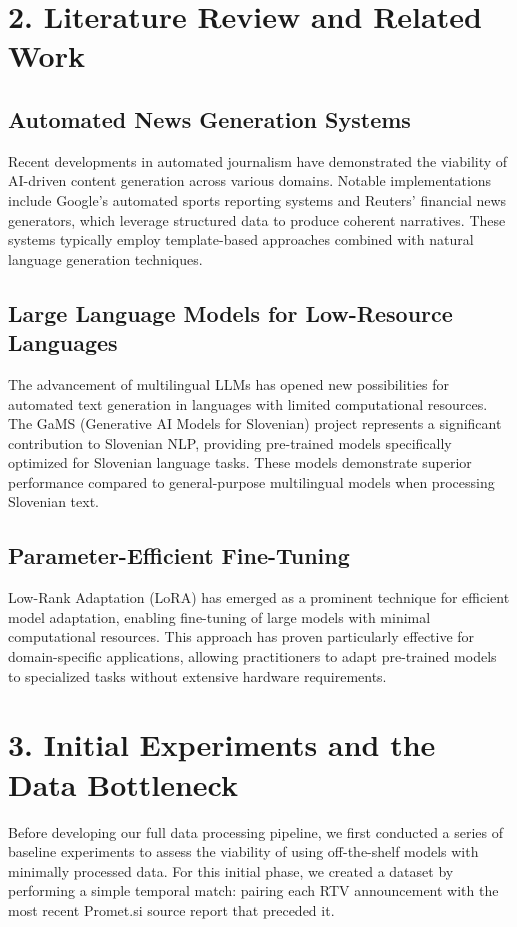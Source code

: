 \documentclass[fleqn,moreauthors,10pt]{ds_report}
\begin{document}
\section*{2. Literature Review and Related Work}

\subsection*{Automated News Generation Systems}
Recent developments in automated journalism have demonstrated the viability of AI-driven content generation across various domains. Notable implementations include Google's automated sports reporting systems and Reuters' financial news generators, which leverage structured data to produce coherent narratives. These systems typically employ template-based approaches combined with natural language generation techniques.

\subsection*{Large Language Models for Low-Resource Languages}
The advancement of multilingual LLMs has opened new possibilities for automated text generation in languages with limited computational resources. The GaMS (Generative AI Models for Slovenian) project represents a significant contribution to Slovenian NLP, providing pre-trained models specifically optimized for Slovenian language tasks. These models demonstrate superior performance compared to general-purpose multilingual models when processing Slovenian text.

\subsection*{Parameter-Efficient Fine-Tuning}
Low-Rank Adaptation (LoRA) has emerged as a prominent technique for efficient model adaptation, enabling fine-tuning of large models with minimal computational resources. This approach has proven particularly effective for domain-specific applications, allowing practitioners to adapt pre-trained models to specialized tasks without extensive hardware requirements.

\section*{3. Initial Experiments and the Data Bottleneck}
Before developing our full data processing pipeline, we first conducted a series of baseline experiments to assess the viability of using off-the-shelf models with minimally processed data. For this initial phase, we created a dataset by performing a simple temporal match: pairing each RTV announcement with the most recent Promet.si source report that preceded it.
\end{document}
